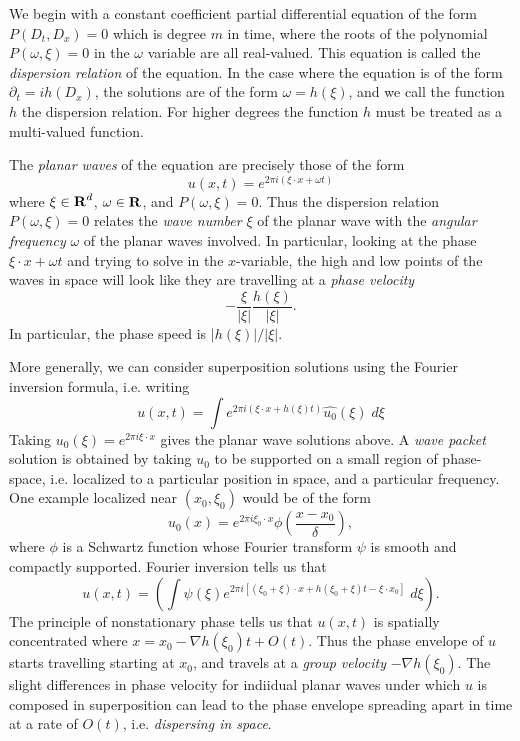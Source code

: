 We begin with a constant coefficient partial differential equation of the form $P(D_t, D_x) = 0$ which is degree $m$ in time, where the roots of the polynomial $P(\omega, \xi) = 0$ in the $\omega$ variable are all real-valued. This equation is called the \emph{dispersion relation} of the equation. In the case where the equation is of the form $\partial_t = i h(D_x)$, the solutions are of the form $\omega = h(\xi)$, and we call the function $h$ the dispersion relation. For higher degrees the function $h$ must be treated as a multi-valued function.

The \emph{planar waves} of the equation are precisely those of the form
%
\[ u(x,t) = e^{2 \pi i (\xi \cdot x + \omega t)} \]
%
where $\xi \in \operatorname{\mathbf{R}}^d$, $\omega \in \operatorname{\mathbf{R}}$, and $P(\omega,\xi) = 0$. Thus the dispersion relation $P(\omega,\xi) = 0$ relates the \emph{wave number} $\xi$ of the planar wave with the \emph{angular frequency} $\omega$ of the planar waves involved. In particular, looking at the phase $\xi \cdot x + \omega t$ and trying to solve in the $x$-variable, the high and low points of the waves in space will look like they are travelling at a \emph{phase velocity}
%
\[ - \frac{\xi}{|\xi|} \frac{h(\xi)}{|\xi|}. \]
%
In particular, the phase speed is $|h(\xi)| / |\xi|$.

More generally, we can consider superposition solutions using the Fourier inversion formula, i.e. writing
%
\[ u(x,t) = \int e^{2 \pi i (\xi \cdot x + h(\xi) t)} \widehat{u_0}(\xi)\; d\xi \]
%
Taking $u_0(\xi) = e^{2 \pi i \xi \cdot x}$ gives the planar wave solutions above. A \emph{wave packet} solution is obtained by taking $u_0$ to be supported on a small region of phase-space, i.e. localized to a particular position in space, and a particular frequency. One example localized near $(x_0,\xi_0)$ would be of the form
%
\[ u_0(x) = e^{2 \pi i \xi_0 \cdot x} \phi \left( \frac{x - x_0}{\delta} \right), \]
%
where $\phi$ is a Schwartz function whose Fourier transform $\psi$ is smooth and compactly supported. Fourier inversion tells us that
%
\[ u(x,t) = \left( \int \psi(\xi) e^{2 \pi i [ (\xi_0 + \xi) \cdot x + h(\xi_0 + \xi) t - \xi \cdot x_0 ]}\; d\xi \right). \]
%
The principle of nonstationary phase tells us that $u(x,t)$ is spatially concentrated where $x = x_0 - \nabla h(\xi_0) t + O(t)$. Thus the phase envelope of $u$ starts travelling starting at $x_0$, and travels at a \emph{group velocity} $- \nabla h(\xi_0)$.
%
%
The slight differences in phase velocity for indiidual planar waves under which $u$ is composed in superposition can lead to the phase envelope spreading apart in time at a rate of $O(t)$, i.e. \emph{dispersing in space}.

